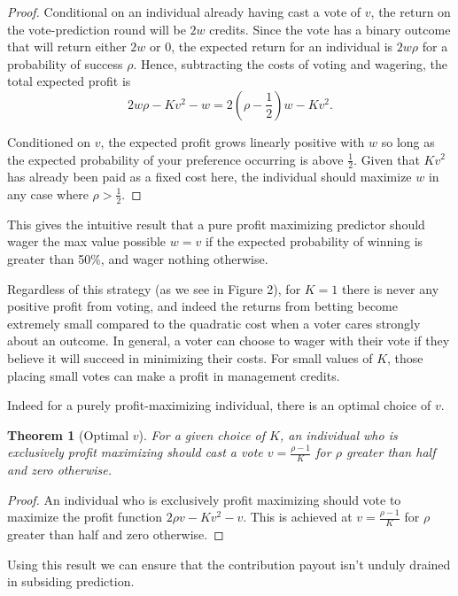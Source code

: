 \documentclass{article}
\newtheorem{theorem}{Theorem}[section]
\begin{document}
\begin{proof}
Conditional on an individual already having cast a vote of $v$, the return on the vote-prediction round will be $2w$ credits. Since the vote has a binary outcome that will return either $2w$ or 0, the expected return for an individual is $2w\rho$ for a probability of success $\rho$. Hence, subtracting the costs of voting and wagering, the total expected profit is 
\[ 2w\rho - K v^2 - w = 2\left(\rho - \frac{1}{2}\right)w - K v^2. \]

Conditioned on $v$, the expected profit grows linearly positive with $w$ so long as the expected probability of your preference occurring is above $\frac{1}{2}$. Given that $K v^2$ has already been paid as a fixed cost here, the individual should maximize $w$ in any case where $\rho > \frac{1}{2}$.
\end{proof}

This gives the intuitive result that a pure profit maximizing predictor should wager the max value possible $w=v$ if the expected probability of winning is greater than 50\%, and wager nothing otherwise.

Regardless of this strategy (as we see in Figure 2), for $K=1$ there is never any positive profit from voting, and indeed the returns from betting become extremely small compared to the quadratic cost when a voter cares strongly about an outcome. In general, a voter can choose to wager with their vote if they believe it will succeed in minimizing their costs. For small values of $K$, those placing small votes can make a profit in management credits.

Indeed for a purely profit-maximizing individual, there is an optimal choice of $v$.

\begin{theorem}[Optimal $v$]
For a given choice of $K$, an individual who is exclusively profit maximizing should cast a vote $v = \frac{\rho - 1}{K}$ for $\rho$ greater than half and zero otherwise.
\end{theorem}

\begin{proof}
An individual who is exclusively profit maximizing should vote to maximize the profit function $2\rho v - K v^2 - v$. This is achieved at $v = \frac{\rho - 1}{K}$ for $\rho$ greater than half and zero otherwise.
\end{proof}

Using this result we can ensure that the contribution payout isn't unduly drained in subsiding prediction.
\end{document}
